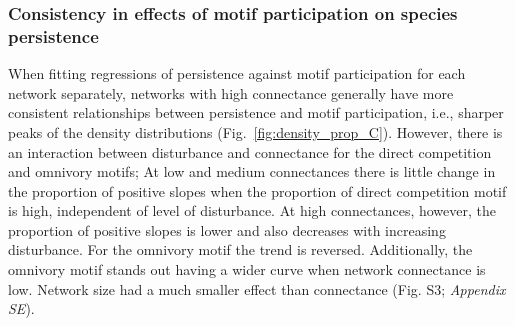 \documentclass[12pt]{article}
\begin{document}
\begin{spacing}{2.0}
        \subsubsection*{Consistency in effects of motif participation on species persistence}

            
            When fitting regressions of persistence against motif participation for each network separately, networks with high connectance generally have more consistent relationships between persistence and motif participation, i.e., sharper peaks of the density distributions (Fig.~\ref{fig:density_prop_C}). However, there is an interaction between disturbance and connectance for the direct competition and omnivory motifs; At low and medium connectances there is little change in the proportion of positive slopes when the proportion of  direct competition motif is high, independent of level of disturbance. At high connectances, however, the proportion of positive slopes is lower and also decreases with increasing disturbance. For the omnivory motif the trend is reversed. Additionally, the omnivory motif stands out having a wider curve when network connectance is low. 
            Network size had a much smaller effect than connectance (Fig. S3; \emph{Appendix SE}).



\end{spacing}
\end{document}
